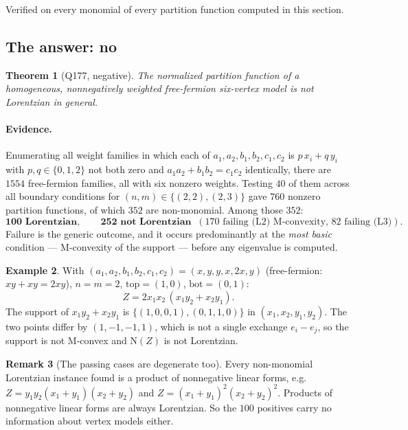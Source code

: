 \documentclass[11pt]{article}
\newtheorem{theorem}{Theorem}[section]
\theoremstyle{definition}
\newtheorem{remark}[theorem]{Remark}
\newtheorem{example}[theorem]{Example}
\newcommand{\N}{\mathrm{N}}
\begin{document}
Verified on every monomial of every partition function computed in this section.

\subsection{The answer: no}

\begin{theorem}[Q177, negative]\label{thm:q177}
The normalized partition function of a homogeneous, nonnegatively weighted free-fermion
six-vertex model is not Lorentzian in general.
\end{theorem}

\paragraph{Evidence.} Enumerating all weight families in which each of
$a_1,a_2,b_1,b_2,c_1,c_2$ is $p\,x_i+q\,y_i$ with $p,q\in\{0,1,2\}$ not both zero and
$a_1a_2+b_1b_2=c_1c_2$ identically, there are $1554$ free-fermion families, all with six
nonzero weights. Testing $40$ of them across all boundary conditions for
$(n,m)\in\{(2,2),(2,3)\}$ gave $760$ nonzero partition functions, of which $352$ are
non-monomial. Among those $352$:
\[
\textbf{100 Lorentzian},\qquad \textbf{252 not Lorentzian}
\;\;(\text{$170$ failing (L2) M-convexity, $82$ failing (L3)}).
\]
Failure is the generic outcome, and it occurs predominantly at the \emph{most basic}
condition --- M-convexity of the support --- before any eigenvalue is computed.

\begin{example}
With $(a_1,a_2,b_1,b_2,c_1,c_2)=(x,y,y,x,2x,y)$ (free-fermion: $xy+xy=2xy$), $n=m=2$,
$\mathrm{top}=(1,0)$, $\mathrm{bot}=(0,1)$:
\[
Z=2x_1x_2\,(x_1y_2+x_2y_1).
\]
The support of $x_1y_2+x_2y_1$ is $\{(1,0,0,1),(0,1,1,0)\}$ in $(x_1,x_2,y_1,y_2)$. The two
points differ by $(1,-1,-1,1)$, which is not a single exchange $e_i-e_j$, so the support is
not M-convex and $\N(Z)$ is not Lorentzian.
\end{example}

\begin{remark}[The passing cases are degenerate too]
Every non-monomial Lorentzian instance found is a product of nonnegative linear forms, e.g.
$Z=y_1y_2(x_1+y_1)(x_2+y_2)$ and $Z=(x_1+y_1)^2(x_2+y_2)^2$. Products of nonnegative linear
forms are always Lorentzian. So the $100$ positives carry no information about vertex models
either.
\end{remark}
\end{document}
